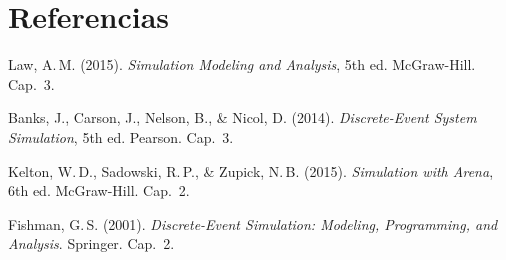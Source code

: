 \documentclass[11pt, letterpaper]{article}
\begin{document}
\section*{Referencias}
\begin{enumerate}[label={[\arabic*]}]
    \item Law, A.\,M. (2015). \textit{Simulation Modeling and Analysis}, 5th ed. McGraw-Hill. Cap.~3.
    \item Banks, J., Carson, J., Nelson, B., \& Nicol, D. (2014). \textit{Discrete-Event System Simulation}, 5th ed. Pearson. Cap.~3.
    \item Kelton, W.\,D., Sadowski, R.\,P., \& Zupick, N.\,B. (2015). \textit{Simulation with Arena}, 6th ed. McGraw-Hill. Cap.~2.
    \item Fishman, G.\,S. (2001). \textit{Discrete-Event Simulation: Modeling, Programming, and Analysis}. Springer. Cap.~2.
\end{enumerate}
\end{document}
